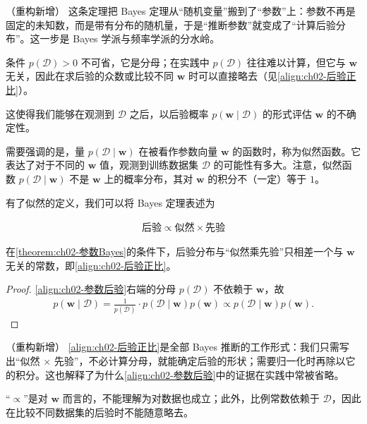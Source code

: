 \documentclass[../../main.tex]{subfiles}
\begin{document}
\begin{remark}（重构新增）
这条定理把 Bayes 定理从“随机变量”搬到了“参数”上：参数不再是固定的未知数，而是带有分布的随机量，于是“推断参数”就变成了“计算后验分布”。这一步是 Bayes 学派与频率学派的分水岭。

条件 $p(\mathcal{D})>0$ 不可省，它是分母；在实践中 $p(\mathcal{D})$ 往往难以计算，但它与 $\mathbf{w}$ 无关，因此在求后验的众数或比较不同 $\mathbf{w}$ 时可以直接略去（见\eqref{align:ch02-后验正比}）。
\end{remark}

这使得我们能够在观测到 $\mathcal{D}$ 之后，以后验概率 $p(\mathbf{w}\mid\mathcal{D})$ 的形式评估 $\mathbf{w}$ 的不确定性。

需要强调的是，量 $p(\mathcal{D}\mid\mathbf{w})$ 在被看作参数向量 $\mathbf{w}$ 的函数时，称为似然函数。它表达了对于不同的 $\mathbf{w}$ 值，观测到训练数据集 $\mathcal{D}$ 的可能性有多大。注意，似然函数 $p(\mathcal{D}\mid\mathbf{w})$ 不是 $\mathbf{w}$ 上的概率分布，其对 $\mathbf{w}$ 的积分不（一定）等于 $1$。

有了似然的定义，我们可以将 Bayes 定理表述为

\begin{align}
  \text{后验} \propto \text{似然} \times \text{先验}
  \label{align:ch02-后验正比}
\end{align}

\begin{proposition}[后验正比于似然乘先验]\label{proposition:ch02-后验正比}
在\cref{theorem:ch02-参数Bayes}的条件下，后验分布与“似然乘先验”只相差一个与 $\mathbf{w}$ 无关的常数，即\eqref{align:ch02-后验正比}。
\end{proposition}

\begin{proof}
\eqref{align:ch02-参数后验}右端的分母 $p(\mathcal{D})$ 不依赖于 $\mathbf{w}$，故
\begin{align*}
  p(\mathbf{w}\mid\mathcal{D}) = \frac{1}{p(\mathcal{D})}\cdot p(\mathcal{D}\mid\mathbf{w})p(\mathbf{w}) \propto p(\mathcal{D}\mid\mathbf{w})p(\mathbf{w}) .
\end{align*}
\end{proof}

\begin{remark}（重构新增）
\eqref{align:ch02-后验正比}是全部 Bayes 推断的工作形式：我们只需写出“似然 × 先验”，不必计算分母，就能确定后验的形状；需要归一化时再除以它的积分。这也解释了为什么\eqref{align:ch02-参数后验}中的证据在实践中常被省略。

“$\propto$”是对 $\mathbf{w}$ 而言的，不能理解为对数据也成立；此外，比例常数依赖于 $\mathcal{D}$，因此在比较不同数据集的后验时不能随意略去。
\end{remark}
\end{document}
